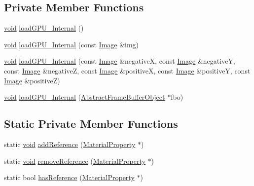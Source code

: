 \subsection*{Private Member Functions}
\begin{DoxyCompactItemize}
\item 
\mbox{\hyperlink{_thread_8h_af1e856da2e658414cb2456cb6f7ebc66}{void}} \mbox{\hyperlink{classnjli_1_1_material_property_a9952072ad753a049bf653dc55a7089b0}{load\+G\+P\+U\+\_\+\+Internal}} ()
\item 
\mbox{\hyperlink{_thread_8h_af1e856da2e658414cb2456cb6f7ebc66}{void}} \mbox{\hyperlink{classnjli_1_1_material_property_a2279e0f7abdce078f62c121520cac369}{load\+G\+P\+U\+\_\+\+Internal}} (const \mbox{\hyperlink{classnjli_1_1_image}{Image}} \&img)
\item 
\mbox{\hyperlink{_thread_8h_af1e856da2e658414cb2456cb6f7ebc66}{void}} \mbox{\hyperlink{classnjli_1_1_material_property_aa9a78f32c94e7d5e822dd328eb954ec9}{load\+G\+P\+U\+\_\+\+Internal}} (const \mbox{\hyperlink{classnjli_1_1_image}{Image}} \&negativeX, const \mbox{\hyperlink{classnjli_1_1_image}{Image}} \&negativeY, const \mbox{\hyperlink{classnjli_1_1_image}{Image}} \&negativeZ, const \mbox{\hyperlink{classnjli_1_1_image}{Image}} \&positiveX, const \mbox{\hyperlink{classnjli_1_1_image}{Image}} \&positiveY, const \mbox{\hyperlink{classnjli_1_1_image}{Image}} \&positiveZ)
\item 
\mbox{\hyperlink{_thread_8h_af1e856da2e658414cb2456cb6f7ebc66}{void}} \mbox{\hyperlink{classnjli_1_1_material_property_a0e2f5b5c25f4b11f282905cd4492c5f8}{load\+G\+P\+U\+\_\+\+Internal}} (\mbox{\hyperlink{classnjli_1_1_abstract_frame_buffer_object}{Abstract\+Frame\+Buffer\+Object}} $\ast$fbo)
\end{DoxyCompactItemize}
\subsection*{Static Private Member Functions}
\begin{DoxyCompactItemize}
\item 
static \mbox{\hyperlink{_thread_8h_af1e856da2e658414cb2456cb6f7ebc66}{void}} \mbox{\hyperlink{classnjli_1_1_material_property_a9bbe416abf678f714afc3cedbe235b11}{add\+Reference}} (\mbox{\hyperlink{classnjli_1_1_material_property}{Material\+Property}} $\ast$)
\item 
static \mbox{\hyperlink{_thread_8h_af1e856da2e658414cb2456cb6f7ebc66}{void}} \mbox{\hyperlink{classnjli_1_1_material_property_a9aedcf990d5787c531ae4126d1329c5e}{remove\+Reference}} (\mbox{\hyperlink{classnjli_1_1_material_property}{Material\+Property}} $\ast$)
\item 
static bool \mbox{\hyperlink{classnjli_1_1_material_property_aebfaf86035d419025c151dfdd20bd6b1}{has\+Reference}} (\mbox{\hyperlink{classnjli_1_1_material_property}{Material\+Property}} $\ast$)
\end{DoxyCompactItemize}
